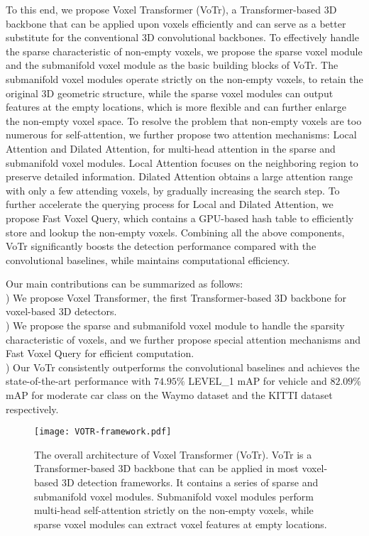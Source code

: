 \documentclass[10pt,twocolumn,letterpaper]{article}
\begin{document}
To this end, we propose Voxel Transformer (VoTr), a Transformer-based 3D backbone that can be applied upon voxels efficiently and can serve as a better substitute for the conventional 3D convolutional backbones. To effectively handle the sparse characteristic of non-empty voxels, we propose the sparse voxel module and the submanifold voxel module as the basic building blocks of VoTr. The submanifold voxel modules operate strictly on the non-empty voxels, to retain the original 3D geometric structure, while the sparse voxel modules can output features at the empty locations, which is more flexible and can further enlarge the non-empty voxel space. To resolve the problem that non-empty voxels are too numerous for self-attention, we further propose two attention mechanisms: Local Attention and Dilated Attention, for multi-head attention in the sparse and submanifold voxel modules. Local Attention focuses on the neighboring region to preserve detailed information. Dilated Attention obtains a large attention range with only a few attending voxels, by gradually increasing the search step. To further accelerate the querying process for Local and Dilated Attention, we propose Fast Voxel Query, which contains a GPU-based hash table to efficiently store and lookup the non-empty voxels. Combining all the above components, VoTr significantly boosts the detection performance compared with the convolutional baselines, while maintains computational efficiency.

Our main contributions can be summarized as follows:\\
) We propose Voxel Transformer, the first Transformer-based 3D backbone for voxel-based 3D detectors.\\
) We propose the sparse and submanifold voxel module to handle the sparsity characteristic of voxels, and we further propose special attention mechanisms and Fast Voxel Query for efficient computation.\\ 
) Our VoTr consistently outperforms the convolutional baselines and achieves the state-of-the-art performance with $74.95\%$ LEVEL\_1 mAP for vehicle and $82.09\%$ mAP for moderate car class on the Waymo dataset and the KITTI dataset respectively.

\begin{figure*}[!t]
\centering
\texttt{[image: VOTR-framework.pdf]}
\caption{The overall architecture of Voxel Transformer (VoTr). VoTr is a Transformer-based 3D backbone that can be applied in most voxel-based 3D detection frameworks. It contains a series of sparse and submanifold voxel modules. Submanifold voxel modules perform multi-head self-attention strictly on the non-empty voxels, while sparse voxel modules can extract voxel features at empty locations.}
\label{fig_framework}
\end{figure*}
\end{document}
